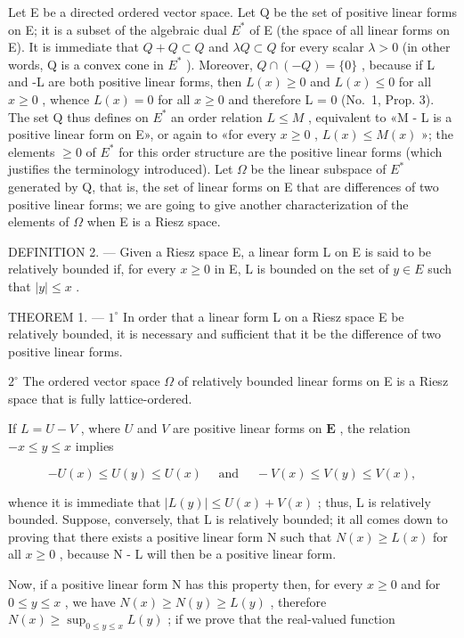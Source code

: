 Let E be a directed ordered vector space. Let Q be the set of positive linear forms on E; it is a subset of the algebraic dual \(E^{*}\) of E (the space of all linear forms on E). It is immediate that \(Q + Q \subset Q\) and \(\lambda Q \subset Q\) for every scalar \(\lambda > 0\) (in other words, Q is a convex cone in \(E^{*}\) ). Moreover, \(Q \cap (-Q) = \{0\}\) , because if L and -L are both positive linear forms, then \(L(x) \geqslant 0\) and \(L(x) \leqslant 0\) for all \(x \geqslant 0\) , whence \(L(x) = 0\) for all \(x \geqslant 0\) and therefore L = 0 (No.~1, Prop. 3). The set Q thus defines on \(E^{*}\) an order relation \(L \leqslant M\) , equivalent to «M - L is a positive linear form on E», or again to «for every \(x \geqslant 0\) , \(L(x) \leqslant M(x)\) »; the elements \(\geqslant 0\) of \(E^{*}\) for this order structure are the positive linear forms (which justifies the terminology introduced). Let \(\Omega\) be the linear subspace of \(E^{*}\) generated by Q, that is, the set of linear forms on E that are differences of two positive linear forms; we are going to give another characterization of the elements of \(\Omega\) when E is a Riesz space.

DEFINITION 2. --- Given a Riesz space E, a linear form L on E is said to be relatively bounded if, for every \(x \geqslant 0\) in E, L is bounded on the set of \(y \in E\) such that \(|y| \leqslant x\) .

THEOREM 1. --- \(1^{\circ}\) In order that a linear form L on a Riesz space E be relatively bounded, it is necessary and sufficient that it be the difference of two positive linear forms.

\(2^{\circ}\) The ordered vector space \(\Omega\) of relatively bounded linear forms on E is a Riesz space that is fully lattice-ordered.

If \(L = U - V\) , where \(U\) and \(V\) are positive linear forms on \(\mathbf{E}\) , the relation \(-x \leqslant y \leqslant x\) implies

\[
- U (x) \leqslant U (y) \leqslant U (x) \quad \text { and } \quad - V (x) \leqslant V (y) \leqslant V (x),
\]

whence it is immediate that \(|L(y)| \leqslant U(x) + V(x)\) ; thus, L is relatively bounded. Suppose, conversely, that L is relatively bounded; it all comes down to proving that there exists a positive linear form N such that \(N(x) \geqslant L(x)\) for all \(x \geqslant 0\) , because N - L will then be a positive linear form.

Now, if a positive linear form N has this property then, for every \(x \geqslant 0\) and for \(0 \leqslant y \leqslant x\) , we have \(N(x) \geqslant N(y) \geqslant L(y)\) , therefore \(N(x) \geqslant \sup_{0 \leqslant y \leqslant x} L(y)\) ; if we prove that the real-valued function

